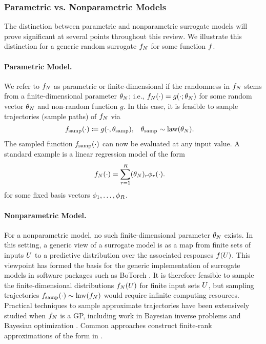 \documentclass[12pt]{article}
\begin{document}
\subsubsection{Parametric vs. Nonparametric Models}
The distinction between parametric and nonparametric surrogate models will 
prove significant at several points throughout this review. We illustrate this
distinction for a generic random surrogate $\funcEm[\Ndesign]$ for some 
function $\func$. 

\paragraph{Parametric Model.}
We refer to $\funcEm[\Ndesign]$ as parametric 
or finite-dimensional if the randomness in $\funcEm[\Ndesign]$ stems from 
a finite-dimensional parameter $\theta_{\Ndesign}$; i.e., 
$\funcEm[\Ndesign](\cdot) = g(\cdot; \theta_{\Ndesign})$ for some 
random vector $\theta_{\Ndesign}$ and non-random function $g$.
In this case, it is feasible to sample trajectories (sample paths) of 
$\funcEm[\Ndesign]$ via 
\begin{align}
&\func_{\mathrm{samp}}(\cdot) \Def g(\cdot, \theta_{\mathrm{samp}}),
&&\theta_{\mathrm{samp}} \sim \mathrm{law}(\theta_{\Ndesign}).
\end{align}
The sampled function $\func_{\mathrm{samp}}(\cdot)$ can now 
be evaluated at any input value. A standard example is a linear 
regression model of the form
\begin{align}
\funcEm[\Ndesign](\cdot) &= \sum_{\idxBasis=1}^{\dimBasis} (\theta_{\Ndesign})_{\idxBasis} \basisVec_{\idxBasis}(\cdot).
\label{eq:finite-basis}
\end{align}
for some fixed basis vectors $\basisVec_{1}, \dots, \basisVec_{\dimBasis}$.
 
\paragraph{Nonparametric Model.} For a nonparametric model, no such finite-dimensional 
parameter $\theta_{\Ndesign}$ exists. In this setting, a generic view of a 
surrogate model is as a map from finite sets of inputs $\parMat$ to a predictive distribution 
over the associated responses $\func(\parMat)$. This viewpoint has formed the basis 
for the generic implementation of surrogate models in software packages such as 
BoTorch \citep{botorch}. It is therefore feasible to sample the finite-dimensional distributions
$\funcEm[\Ndesign](\parMat)$ for finite input sets $\parMat$, but sampling trajectories
$\func_{\mathrm{samp}}(\cdot) \sim \mathrm{law}(\funcEm[\Ndesign])$ would require 
infinite computing resources. Practical techniques to sample approximate trajectories have been
extensively studied when $\funcEm[\Ndesign]$ is a GP, including work in 
Bayesian inverse problems \citep{dimRedPolyChaos,functionSpaceMCMC} 
and Bayesian optimization \citep{pathwiseConditioning,samplingGPPosts}.
Common approaches construct finite-rank approximations of the form  
in .
\end{document}

